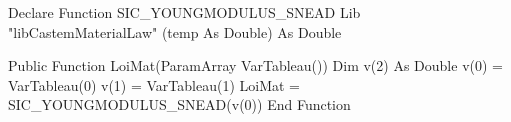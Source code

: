 
Declare Function SIC_YOUNGMODULUS_SNEAD Lib "libCastemMaterialLaw" (temp As Double) As Double

Public Function LoiMat(ParamArray VarTableau())
    Dim v(2) As Double
    v(0) = VarTableau(0)
    v(1) = VarTableau(1)
    LoiMat = SIC_YOUNGMODULUS_SNEAD(v(0))
End Function

